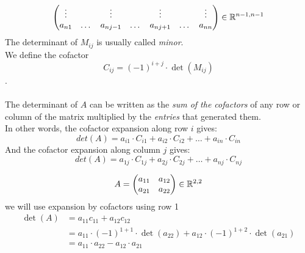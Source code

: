 \begin{enumerate}
$$\begin{pmatrix}
\vdots & {} & \vdots & {} & \vdots & {} & \vdots\\
a_{n1} & \dots & a_{nj-1} & \dots & a_{nj+1} & \dots & a_{nn}\\
\end{pmatrix}\in\mathbb{R}^{n-1,n-1}
$$
The determinant of $M_{ij}$ is usually called \textit{minor}.\\We define the cofactor $$C_{ij} = (-1)^{i+j}\cdot\det(M_{ij})$$.\\ \\The determinant of $A$  can be written as the \textit{sum of the cofactors} of any row or column of the matrix multiplied by the \textit{entries} that generated them.\\In other words, the cofactor expansion along row $i$ gives:
$$det(A)=a_{i1}\cdot C_{i1}+a_{i2}\cdot C_{i2}+\dots+a_{in}\cdot C_{in}$$
And the cofactor expansion along column $j$ gives:
$$det(A)=a_{1j}\cdot C_{1j}+a_{2j}\cdot C_{2j}+\dots+a_{nj}\cdot C_{nj}$$

\end{enumerate}

\begin{example}
\[
A = \begin{pmatrix}
a_{11} & a_{12}\\
a_{21} & a_{22}
\end{pmatrix}\in\mathbb{R}^{2,2}
\]	
we will use expansion by cofactors using row 1
\begin{align*}
\det(A) &= a_{11}c_{11}+a_{12}c_{12}	\\
&=a_{11}\cdot (-1)^{1+1}\cdot \det(a_{22})+a_{12}\cdot (-1)^{1+2}\cdot \det(a_{21})\\
&= a_{11}\cdot a_{22} -a_{12}\cdot a_{21}
\end{align*}
\end{example}

